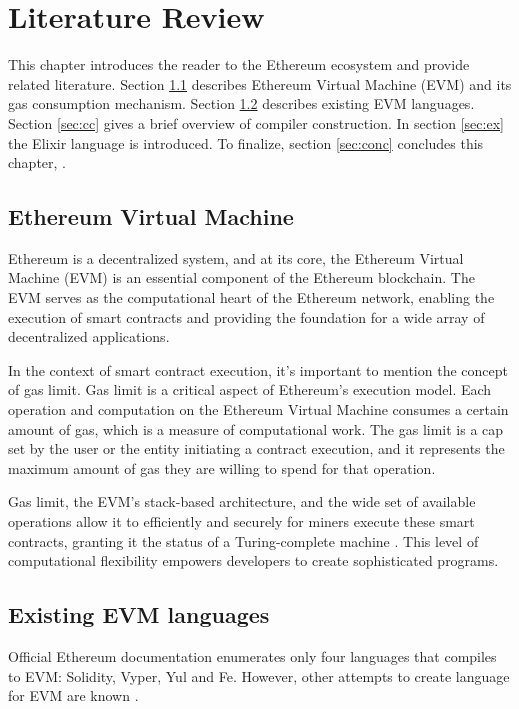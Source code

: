\chapter{Literature Review}
\label{chap:lr}

This chapter introduces the reader to the Ethereum ecosystem and provide related literature.
Section \ref{sec:evm} describes Ethereum Virtual Machine (EVM) and its gas consumption mechanism. Section \ref{sec:langs} describes existing EVM languages. Section \ref{sec:cc} gives a brief overview of compiler construction. In section \ref{sec:ex} the Elixir language is introduced. To finalize, section \ref{sec:conc} concludes this chapter,  .

\section{Ethereum Virtual Machine}
\label{sec:evm}
Ethereum is a decentralized system, and at its core, the Ethereum Virtual Machine (EVM) is an essential component of the Ethereum blockchain. The EVM serves as the computational heart of the Ethereum network, enabling the execution of smart contracts and providing the foundation for a wide array of decentralized applications.

In the context of smart contract execution, it's important to mention the concept of gas limit. Gas limit is a critical aspect of Ethereum's execution model. Each operation and computation on the Ethereum Virtual Machine consumes a certain amount of gas, which is a measure of computational work. The gas limit is a cap set by the user or the entity initiating a contract execution, and it represents the maximum amount of gas they are willing to spend for that operation.

Gas limit, the EVM's stack-based architecture, and the wide set of available operations allow it to efficiently and securely for miners execute these smart contracts, granting it the status of a Turing-complete machine \cite{EthereumWhitepaper}. This level of computational flexibility empowers developers to create sophisticated programs.

\section{Existing EVM languages}
\label{sec:langs}
Official Ethereum documentation \cite{OfficialEthereumLanguages} enumerates only four languages that compiles to EVM: Solidity, Vyper, Yul and Fe. However, other attempts to create language for EVM are known \cite{CommunityEthereumLanguages}.

